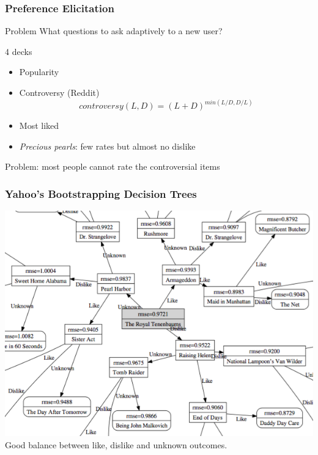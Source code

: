 \documentclass[handout]{beamer}
\begin{document}
\begin{frame}
    \frametitle{Preference Elicitation}
    \begin{block}{Problem}
        What questions to ask adaptively to a new user?
    \end{block}
    \pause
    \begin{exampleblock}{4 decks}
        \begin{itemize}
        \item Popularity
        \item Controversy (Reddit)
        \[ controversy(L, D) = {(L + D)}^{min(L / D, D / L)} \]
        \item Most liked
        \item \emph{Precious pearls}: few rates but almost no dislike
        \end{itemize}
    \end{exampleblock}
    Problem: most people cannot rate the controversial items
\end{frame}

\begin{frame}
  \frametitle{Yahoo's Bootstrapping Decision Trees}
  \centering
  \includegraphics[width=0.9\linewidth]{figures/decisiontree.png}\\
  Good balance between like, dislike and unknown outcomes.
\end{frame}
\end{document}
